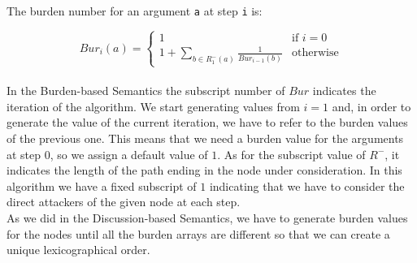 \documentclass{scrbook}
\begin{document}
The burden number for an argument \texttt{a} at step \texttt{i} is:

\[
    Bur_i(a) =
    \begin{cases}
        1 & \text{if $i = 0$} \\
        1 + \sum_{b \in R_1^-(a)}\frac{1}{Bur_{i-1}(b)} &
        \text{otherwise}
    \end{cases}
\] \\

In the Burden-based Semantics the subscript number of $Bur$ indicates the iteration of the algorithm. We start generating values from $i=1$ and, in order to generate the value of the current iteration, we have to refer to the burden values of the previous one.
This means that we need a burden value for the arguments at step $0$, so we assign a default value of $1$.
As for the subscript value of $R^-$, it indicates the length of the path ending in the node under consideration. In this algorithm we have a fixed subscript of $1$ indicating that we have to consider the direct attackers of the given node at each step. \\

As we did in the Discussion-based Semantics, we have to generate burden values for the nodes until all the burden arrays are different so that we can create a unique lexicographical order. \\
\end{document}
